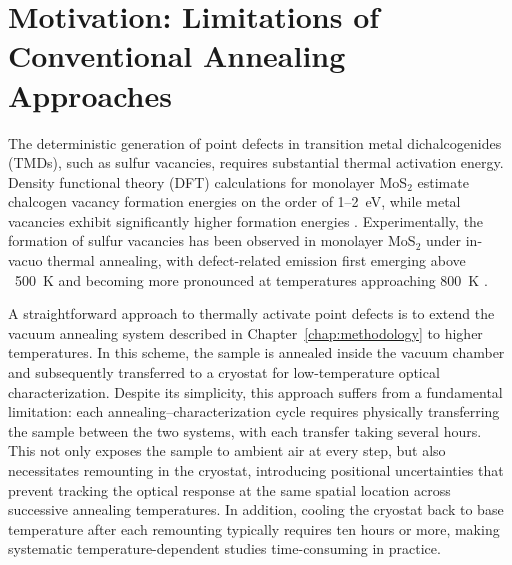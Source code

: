 
    


\section{Motivation: Limitations of Conventional Annealing Approaches}
\label{sec:Motivation: Limitations of Conventional Annealing Approaches}

The deterministic generation of point defects in transition metal dichalcogenides (TMDs), such as sulfur vacancies, requires substantial thermal activation energy. Density functional theory (DFT) calculations for monolayer MoS$_2$ estimate chalcogen vacancy formation energies on the order of 1--2~eV, while metal vacancies exhibit significantly higher formation energies \cite{noh-2014,komsa-2015}. Experimentally, the formation of sulfur vacancies has been observed in monolayer MoS$_2$ under in-vacuo thermal annealing, with defect-related emission first emerging above ~500~K and becoming more pronounced at temperatures approaching 800~K \cite{mitterreiter2021role}.

A straightforward approach to thermally activate point defects is to extend the vacuum annealing system described in Chapter~\ref{chap:methodology} to higher temperatures. In this scheme, the sample is annealed inside the vacuum chamber and subsequently transferred to a cryostat for low-temperature optical characterization. Despite its simplicity, this approach suffers from a fundamental limitation: each annealing--characterization cycle requires physically transferring the sample between the two systems, with each transfer taking several hours. This not only exposes the sample to ambient air at every step, but also necessitates remounting in the cryostat, introducing positional uncertainties that prevent tracking the optical response at the same spatial location across successive annealing temperatures. In addition, cooling the cryostat back to base temperature after each remounting typically requires ten hours or more, making systematic temperature-dependent studies time-consuming in practice.

